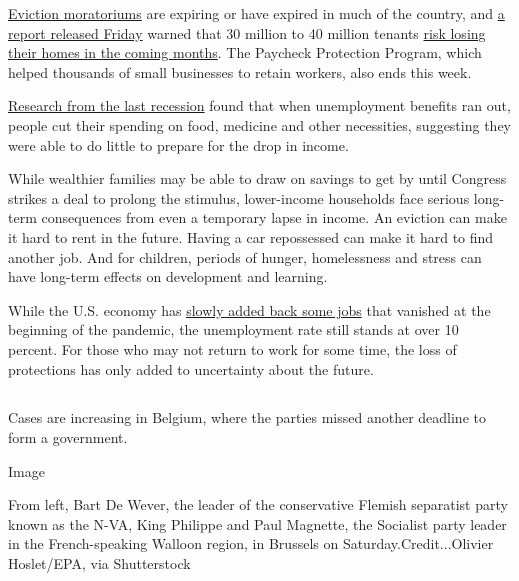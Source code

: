 \href{https://www.nytimes.com/2020/08/07/business/economy/housing-economy-eviction-renters.html}{Eviction
moratoriums} are expiring or have expired in much of the country, and
\href{https://nlihc.org/sites/default/files/The_Eviction_Crisis_080720.pdf}{a
report released Friday} warned that 30 million to 40 million tenants
\href{https://www.nytimes.com/2020/08/07/business/economy/housing-economy-eviction-renters.html}{risk
losing their homes in the coming months}. The Paycheck Protection
Program, which helped thousands of small businesses to retain workers,
also ends this week.

\href{https://www.aeaweb.org/articles?id=10.1257/aer.20170537}{Research
from the last recession} found that when unemployment benefits ran out,
people cut their spending on food, medicine and other necessities,
suggesting they were able to do little to prepare for the drop in
income.

While wealthier families may be able to draw on savings to get by until
Congress strikes a deal to prolong the stimulus, lower-income households
face serious long-term consequences from even a temporary lapse in
income. An eviction can make it hard to rent in the future. Having a car
repossessed can make it hard to find another job. And for children,
periods of hunger, homelessness and stress can have long-term effects on
development and learning.

While the U.S. economy has
\href{https://www.nytimes.com/live/2020/08/07/business/stock-market-today-coronavirus}{slowly
added back some jobs} that vanished at the beginning of the pandemic,
the unemployment rate still stands at over 10 percent. For those who may
not return to work for some time, the loss of protections has only added
to uncertainty about the future.

\hypertarget{section-5}{%
\subsection{}\label{section-5}}

Cases are increasing in Belgium, where the parties missed another
deadline to form a government.

Image

From left, Bart De Wever, the leader of the conservative Flemish
separatist party known as the N-VA, King Philippe and Paul Magnette, the
Socialist party leader in the French-speaking Walloon region, in
Brussels on Saturday.Credit...Olivier Hoslet/EPA, via Shutterstock

